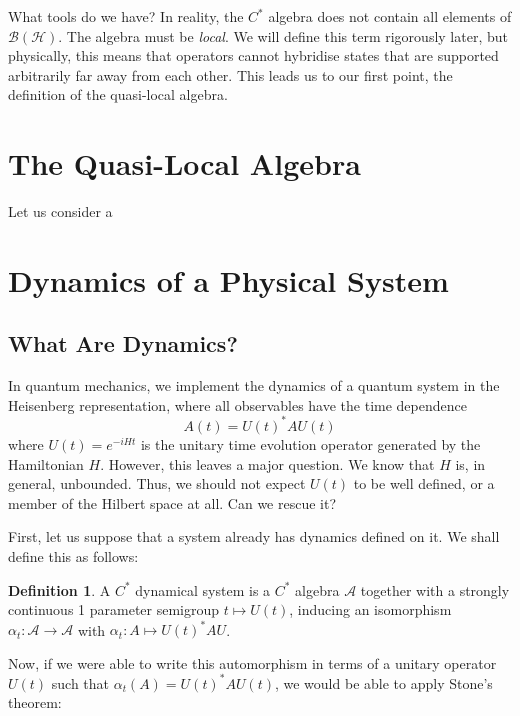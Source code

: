 \documentclass[prb,12pt, nofootinbib]{revtex4-2}
\theoremstyle{definition}
\theoremstyle{definition}
\theoremstyle{definition}
\theoremstyle{definition}
\newtheorem{Definition}[Theorem]{Definition}
\begin{document}
What tools do we have? In reality, the $C^*$ algebra does not contain all elements of $\mathcal{B}(\mathcal{H})$. The algebra must be \emph{local}. We will define this term rigorously later, but physically, this means that operators cannot hybridise states that are supported arbitrarily far away from each other. This leads us to our first point, the definition of the quasi-local algebra.
\section{The Quasi-Local Algebra}
Let us consider a 
\section{Dynamics of a Physical System}
\subsection{What Are Dynamics?}
In quantum mechanics, we implement the dynamics of a quantum system in the Heisenberg representation, where all observables have the time dependence
	\[A(t) = U(t)^*AU(t)\]
	where $U(t)=e^{-iHt}$ is the unitary time evolution operator generated by the Hamiltonian $H$. However, this leaves a major question. We know that $H$ is, in general, unbounded. Thus, we should not expect $U(t)$ to be well defined, or a member of the Hilbert space at all. Can we rescue it?
	
	First, let us suppose that a system already has dynamics defined on it. We shall define this as follows:
	\begin{Definition}
		A $C^*$ dynamical system is a $C^*$ algebra $\mathcal{A}$ together with a strongly continuous 1 parameter semigroup $t\mapsto U(t)$, inducing an isomorphism $\alpha_t:\mathcal{A}\to\mathcal{A}$ with $\alpha_t: A\mapsto U(t)^*A U$.  
	\end{Definition}
Now, if we were able to write this automorphism in terms of a unitary operator $U(t)$ such that $\alpha_t(A) = U(t)^* A U(t)$, we would be able to apply Stone's theorem:
\end{document}
